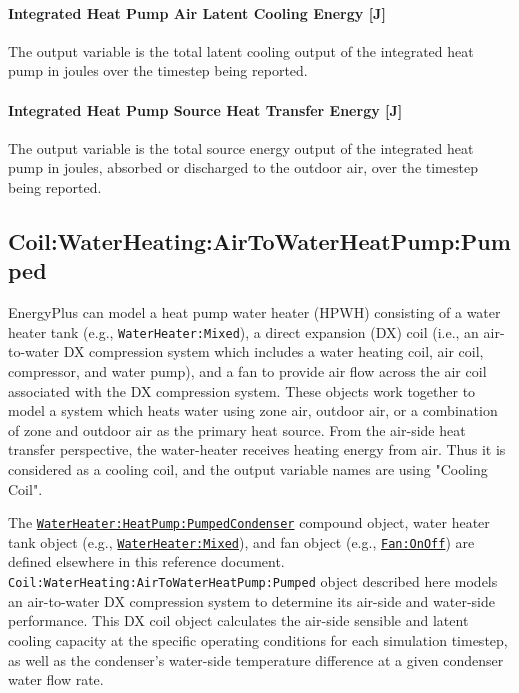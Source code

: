 \paragraph{Integrated Heat Pump Air Latent Cooling Energy {[}J{]}}\label{Out-Total-LatCooling-Energy-ASIHP}
The output variable is the total latent cooling output of the integrated heat pump in joules over the timestep being reported.

\paragraph{Integrated Heat Pump Source Heat Transfer Energy {[}J{]}}\label{Out-Total-Source-Energy-ASIHP}
The output variable is the total source energy output of the integrated heat pump in joules, absorbed or discharged to the outdoor air, over the timestep being reported.

\subsection{Coil:WaterHeating:AirToWaterHeatPump:Pumped}\label{coilwaterheatingairtowaterheatpumppumped}

EnergyPlus can model a heat pump water heater (HPWH) consisting of a water heater tank (e.g., \lstinline!WaterHeater:Mixed!), a direct expansion (DX) coil (i.e., an air-to-water DX compression system which includes a water heating coil, air coil, compressor, and water pump), and a fan to provide air flow across the air coil associated with the DX compression system. These objects work together to model a system which heats water using zone air, outdoor air, or a combination of zone and outdoor air as the primary heat source. From the air-side heat transfer perspective, the water-heater receives heating energy from air. Thus it is considered as a cooling coil, and the output variable names are using "Cooling Coil".

The \hyperref[waterheaterheatpumppumpedcondenser]{\lstinline!WaterHeater:HeatPump:PumpedCondenser!} compound object, water heater tank object (e.g., \hyperref[waterheatermixed]{\lstinline!WaterHeater:Mixed!}), and fan object (e.g., \hyperref[fanonoff]{\lstinline!Fan:OnOff!}) are defined elsewhere in this reference document. \lstinline!Coil:WaterHeating:AirToWaterHeatPump:Pumped! object described here models an air-to-water DX compression system to determine its air-side and water-side performance. This DX coil object calculates the air-side sensible and latent cooling capacity at the specific operating conditions for each simulation timestep, as well as the condenser's water-side temperature difference at a given condenser water flow rate.

